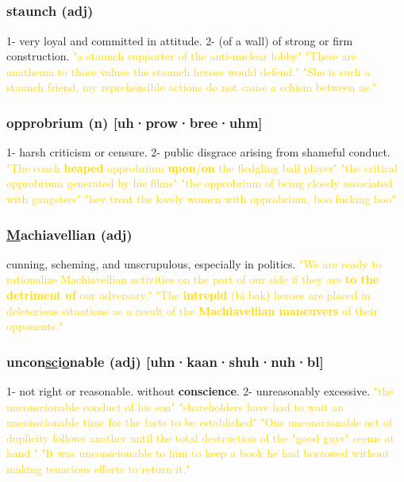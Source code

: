 \documentclass{proc}
\begin{document}
	\newpage
	\subsection{}
	\subsubsection{\textcolor{brickred}{staunch} (adj)}
	1- very loyal and committed in attitude.
	2- (of a wall) of strong or firm construction.
	\textcolor{gold}{"a staunch supporter of the anti-nuclear lobby" "These are anathema to those values the staunch heroes would defend." "She is such a staunch friend, my reprehensible actions do not cause a schism between us."}
	
	\subsubsection{\textcolor{brickred}{opprobrium} (n) [uh·prow·bree·uhm]}
	1- harsh criticism or censure.
	2- public disgrace arising from shameful conduct.
	\textcolor{gold}{"The coach \textbf{heaped} opprobrium \textbf{upon}/\textbf{on} the fledgling ball player" "the critical opprobrium generated by his films" "the opprobrium of being closely associated with gangsters" "hey treat the lovely women with opprobrium, boo fucking hoo"}
	
	\subsubsection{\textcolor{brickred}{\underline{M}achiavellian} (adj)}
	cunning, scheming, and unscrupulous, especially in politics.
	\textcolor{gold}{"We are ready to rationalize Machiavellian activities on the part of our side if they are \textbf{to the detriment of} our adversary." "The \textbf{intrepid} (bi bak) heroes are  placed in  deleterious situations as a result of the \textbf{Machiavellian maneuvers} of their opponents."}
	
	\subsubsection{\textcolor{brickred}{uncon\underline{sc}i\underline{o}nable} (adj) [uhn·kaan·shuh·nuh·bl]}
	1- not right or reasonable. without \textbf{conscience}.
	2- unreasonably excessive.
	\textcolor{gold}{"the unconscionable conduct of his son" "shareholders have had to wait an unconscionable time for the facts to be established" "One unconscionable act of duplicity follows another until the total destruction of the "good  guys" seems at hand." "It was unconscionable to him to keep a book he had borrowed without making tenacious efforts to return it."}
	
\end{document}
